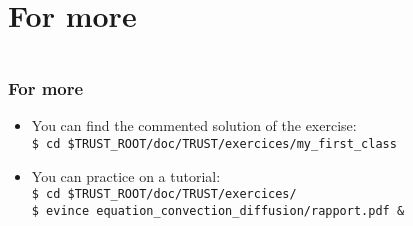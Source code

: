 \documentclass[10pt, hyperref={unicode=true,pdfusetitle, bookmarks=true,bookmarksnumbered=false,bookmarksopen=false, breaklinks=false,pdfborder={0 0 1},backref=true,colorlinks=true,linkcolor=darkblue,pageanchor, urlcolor=darkblue}]{beamer}
\begin{document}
\section{{\bf{For more}}}
\begin{frame}
\begin{columns}[c] 
\tableofcontents[sections={1-3},currentsection, currentsubsection]
\tableofcontents[sections={4-8},currentsection, currentsubsection]
\end{columns}
\end{frame}
\begin{frame}
\frametitle{For more}
\begin{block}{}

\begin{itemize}
\item You can find the commented solution of the exercise:\\
\texttt{\$ cd \$TRUST\_ROOT/doc/TRUST/exercices/my\_first\_class}

\item You can practice on a tutorial:\\
\texttt{\$ cd \$TRUST\_ROOT/doc/TRUST/exercices/}\\
\texttt{\$ evince equation\_convection\_diffusion/rapport.pdf \&}
\end{itemize}

\end{block}
\end{frame}













\end{document}
